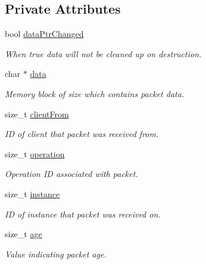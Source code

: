 \subsection*{Private Attributes}
\begin{DoxyCompactItemize}
\item 
bool \hyperlink{class_packet_ab790106eb4fd31c750c3e39ee46c07c8}{dataPtrChanged}
\begin{DoxyCompactList}\small\item\em When true data will not be cleaned up on destruction. \item\end{DoxyCompactList}\item 
char $\ast$ \hyperlink{class_packet_a6ce50b69127890b9012cb91f287f137f}{data}
\begin{DoxyCompactList}\small\item\em Memory block of size which contains packet data. \item\end{DoxyCompactList}\item 
size\_\-t \hyperlink{class_packet_ae3b05f3a3a910c466caa042f5b6961dd}{clientFrom}
\begin{DoxyCompactList}\small\item\em ID of client that packet was received from. \item\end{DoxyCompactList}\item 
size\_\-t \hyperlink{class_packet_a03920d292b5acc0f9223f6364d663001}{operation}
\begin{DoxyCompactList}\small\item\em Operation ID associated with packet. \item\end{DoxyCompactList}\item 
size\_\-t \hyperlink{class_packet_afce0ae0cb900f81df3cb1aaa2d197495}{instance}
\begin{DoxyCompactList}\small\item\em ID of instance that packet was received on. \item\end{DoxyCompactList}\item 
size\_\-t \hyperlink{class_packet_af82113a0e0b36819fcbe4b8245db579e}{age}
\begin{DoxyCompactList}\small\item\em Value indicating packet age. \item\end{DoxyCompactList}\item 

\end{DoxyCompactItemize}
